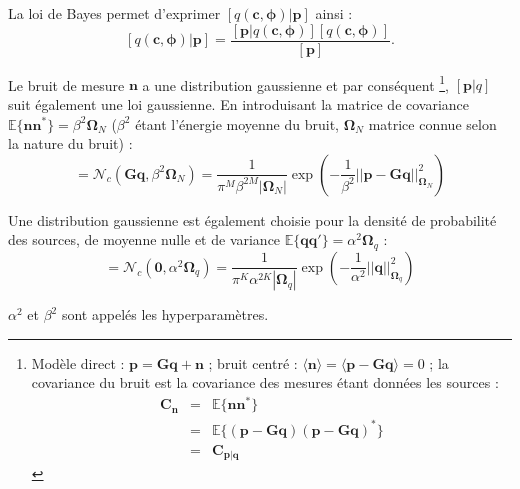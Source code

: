 La loi de Bayes permet d'exprimer $[q(\bm{c},\bm{\phi})|\bm{p}]$ ainsi : 
\begin{equation}
\label{bayes}
[q(\bm{c},\bm{\phi})|\bm{p}]=\frac{[\bm{p}|q(\bm{c},\bm{\phi})][q(\bm{c},\bm{\phi})]}{[\bm{p}]}.
\end{equation}



Le bruit de mesure $\bm{n}$  a une distribution gaussienne et par conséquent 
\footnote{Modèle direct : $\bm{p}=\bm{Gq}+\bm{n}$ ; bruit centré : $\langle \bm{n}\rangle = \langle \bm{p}-\bm{Gq} \rangle = 0 $ ; la covariance du bruit est la covariance des mesures étant données les sources : 
\begin{eqnarray*}
\bm{C_n}& = & \mathbb{E}\{\bm{n}\bm{n}^*\} \\
		& = & \mathbb{E}\{(\bm{p}-\bm{Gq})(\bm{p}-\bm{Gq})^*\}  \\
		& = & \bm{C_{\bm{p}|\bm{q}}} 
\end{eqnarray*}
},
$[\bm{p}|q]$ suit également une loi gaussienne. En introduisant la matrice de covariance $\mathbb{E}\{\bm{n}\bm{n}^*\}=\beta^{2}\bm{\Omega}_N$ ($\beta^2$ étant l'énergie moyenne du bruit, $\bm{\Omega}_N$ matrice connue selon la nature du bruit) : 
\begin{equation}
[\bm{p}|q,\beta^2] =\mathcal{N}_c(\bm{G}\bm{q},\beta^2\bm{\Omega}_N) = \frac{   1   }{ \pi^M \beta^{2M} |\bm{\Omega}_N| } \exp \left( -\frac{1}{\beta^2} ||   \bm{p}  -  \bm{Gq}  ||^2_{\bm{\Omega}_N} \right)
\end{equation}

Une distribution gaussienne est également choisie pour la densité de probabilité des sources, de moyenne nulle et de variance $\mathbb{E}\{\bm{q}\bm{q}'\}=\alpha^2 \bm{\Omega}_q$ : 
\begin{equation}
	[\bm{q}|\alpha^2] = \mathcal{N}_c(\bm{0}, \alpha^2\bm{\Omega}_q) = \frac{  1  }{  \pi^K\alpha^{2K} |\bm{\Omega}_q|} \exp \left( -\frac{1}{\alpha^2}   ||\bm{q}||^2_{\bm{\Omega}_q} \right)
\end{equation}

$\alpha^2$ et $\beta^2$ sont appelés les hyperparamètres.



